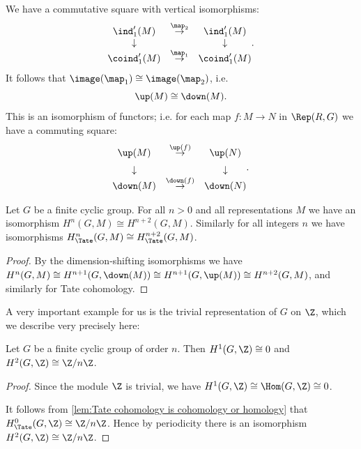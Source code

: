 \begin{definition} \label{def:up iso down}
  \leanok
  We have a commutative square with vertical isomorphisms:
	\[
		\begin{matrix}
			\ind_1'(M) & \stackrel{\map_2}\to & \ind_1'(M) \\
			\downarrow && \downarrow \\
			\coind_1'(M) & \stackrel{\map_1}\to & \coind_1'(M) \\
		\end{matrix}.
	\]
	It follows that $\image(\map_1) \cong \image(\map_2)$,
	i.e.
	\[
		\up(M) \cong \down(M).
	\]
	This is an isomorphism of functors; i.e. for each map $f : M \to N$ in $\Rep(R,G)$
	we have a commuting square:
	\[
		\begin{matrix}
			\up(M) & \stackrel{\up(f)}\to & \up(N) \\[2mm]
			\downarrow && \downarrow \\
			\down(M) & \stackrel{\down(f)}\to & \down(N)
		\end{matrix}.
	\]
\end{definition}

\begin{corollary} \label{cor:periodic cohomology}
  \leanok
	Let $G$ be a finite cyclic group.
	For all $n > 0$ and all representations $M$
	we have an isomorphism $H^{n}(G,M) \cong H^{n+2}(G,M)$.
	Similarly for all integers $n$ we have isomorphisms $H^{n}_{\Tate}(G,M) \cong H^{n+2}_{\Tate}(G,M)$.
\end{corollary}

\begin{proof}
  \leanok
	By the dimension-shifting isomorphisms we have
	$H^{n}(G,M) \cong H^{n+1}(G,\down(M)) \cong H^{n+1}(G,\up(M)) \cong H^{n+2}(G,M)$,
	and similarly for Tate cohomology.
\end{proof}

A very important example for us is the trivial representation of $G$ on $\Z$, which we describe
very precisely here:

\begin{lemma} \label{lem:H2 cyclic Z}
	\leanok

	Let $G$ be a finite cyclic group of order $n$.
	Then $H^1(G,\Z) \cong 0$ and $H^2(G,\Z) \cong \Z/n\Z$.
\end{lemma}
\begin{proof}
	\leanok

	Since the module $\Z$ is trivial, we have $H^1(G,\Z)\cong \Hom(G,\Z) \cong 0$.

	It follows from \ref{lem:Tate cohomology is cohomology or homology}
	that $H^0_{\Tate}(G,\Z) \cong \Z /n\Z$.
	Hence by periodicity there is an isomorphism $H^2(G,\Z) \cong \Z/ n\Z$.
\end{proof}


